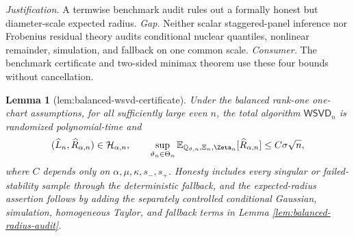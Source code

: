 \documentclass{article}
\newtheorem{lemma}{Lemma}
\begin{document}
\par\smallskip\noindent \textit{Justification.} A termwise benchmark audit rules out a formally honest but diameter-scale expected radius. \textit{Gap.} Neither scalar staggered-panel inference nor Frobenius residual theory audits conditional nuclear quantiles, nonlinear remainder, simulation, and fallback on one common scale. \textit{Consumer.} The benchmark certificate and two-sided minimax theorem use these four bounds without cancellation.

\begin{lemma}[lem:balanced-wsvd-certificate]\label{lem:balanced-wsvd-certificate}
Under the balanced rank-one one-chart assumptions, for all sufficiently large even \(n\), the total algorithm \(\mathsf{WSVD}_n\) is randomized polynomial-time and \[(\widehat L_n,\widehat R_{\alpha,n})\in\mathcal H_{\alpha,n},\qquad \sup_{\vartheta_n\in\Theta_n}\mathbb E_{\mathbb Q_{\vartheta,n},\Xi_n,\Zeta_n}[\widehat R_{\alpha,n}]\le C\sigma\sqrt n,\] where \(C\) depends only on \(\alpha,\mu,\kappa,s_-,s_+\). Honesty includes every singular or failed-stability sample through the deterministic fallback, and the expected-radius assertion follows by adding the separately controlled conditional Gaussian, simulation, homogeneous Taylor, and fallback terms in Lemma \ref{lem:balanced-radius-audit}.
\end{lemma}
\end{document}
